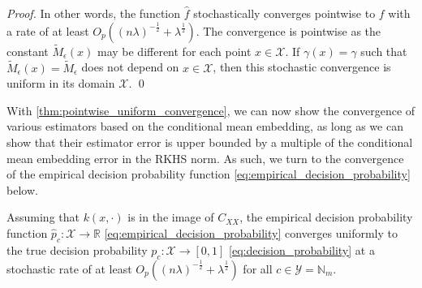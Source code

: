 \documentclass[runningheads, envcountsame, a4paper]{llncs}
\begin{document}
\begin{proof}
			In other words, the function $\hat{f}$ stochastically converges pointwise to $f$ with a rate of at least $O_{p}((n \lambda)^{-\frac{1}{2}} + \lambda^{\frac{1}{2}})$. The convergence is pointwise as the constant $\tilde{M}_{\epsilon}(x)$ may be different for each point $x \in \mathcal{X}$. If $\gamma(x) = \gamma$ such that $\tilde{M}_{\epsilon}(x) = \tilde{M}_{\epsilon}$ does not depend on $x \in \mathcal{X}$, then this stochastic convergence is uniform in its domain $\mathcal{X}$.
			\qed
		\end{proof}
	
		With \cref{thm:pointwise_uniform_convergence}, we can now show the convergence of various estimators based on the conditional mean embedding, as long as we can show that their estimator error is upper bounded by a multiple of the conditional mean embedding error in the \gls{RKHS} norm. As such, we turn to the convergence of the empirical decision probability function \eqref{eq:empirical_decision_probability} below.
		
		\begin{theorem}
			\label{thm:probability_convergence}
			Assuming that $k(x, \cdot)$ is in the image of $C_{XX}$, the empirical decision probability function $\hat{p}_{c} : \mathcal{X} \to \mathbb{R}$ \eqref{eq:empirical_decision_probability} converges uniformly to the true decision probability $p_{c} : \mathcal{X} \to [0, 1]$ \eqref{eq:decision_probability} at a stochastic rate of at least $O_{p}((n \lambda)^{-\frac{1}{2}} + \lambda^{\frac{1}{2}})$ for all $c \in \mathcal{Y} = \mathbb{N}_{m}$.
		\end{theorem}
		
\end{document}
